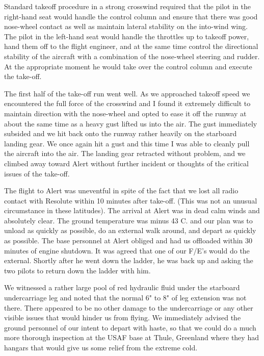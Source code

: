 Standard takeoff procedure in a strong crosswind required that the
pilot in the right-hand seat would handle the control column and ensure
that there was good nose-wheel contact as well as maintain lateral
stability on the into-wind wing. The pilot in the left-hand seat would
handle the throttles up to takeoff power, hand them off to the flight
engineer, and at the same time control the directional stability of the
aircraft with a combination of the nose-wheel steering and rudder. At
the appropriate moment he would take over the control column and
execute the take-off.

The first half of the take-off run went well. As we approached takeoff
speed we encountered the full force of the crosswind and I found it
extremely difficult to maintain direction with the nose-wheel and opted
to ease it off the runway at about the same time as a heavy gust lifted
us into the air. The gust immediately subsided and we hit back onto the
runway rather heavily on the starboard landing gear. We once again hit
a gust and this time I was able to cleanly pull the aircraft into the
air. The landing gear retracted without problem, and we climbed away
toward Alert without further incident or thoughts of the critical
issues of the take-off.

The flight to Alert was uneventful in spite of the fact that we lost
all radio contact with Resolute within 10 minutes after take-off. (This
was not an unusual circumstance in these latitudes). The arrival at
Alert was in dead calm winds and absolutely clear. The ground
temperature was minus 43 C. and our plan was to unload as quickly as
possible, do an external walk around, and depart as quickly as
possible. The base personnel at Alert obliged and had us offloaded
within 30 minutes of engine shutdown. It was agreed that one of our
F/E's would do the external. Shortly after he went down the ladder, he
was back up and asking the two pilots to return down the ladder with
him.

We witnessed a rather large pool of red hydraulic fluid under the
starboard undercarriage leg and noted that the normal 6" to 8" of leg
extension was not there. There appeared to be no other damage to the
undercarriage or any other visible issues that would hinder us from
flying. We immediately advised the ground personnel of our intent to
depart with haste, so that we could do a much more thorough inspection
at the USAF base at Thule, Greenland where they had hangars that would
give us some relief from the extreme cold.

